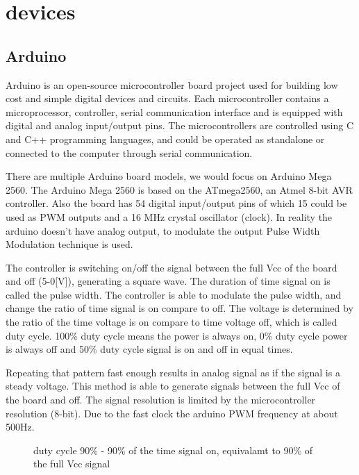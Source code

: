 \documentclass[\main/master.tex]{subfiles}
\begin{document}
\chapter{devices}\label{chp:3}
\doublespacing

\section{Arduino}
Arduino is an open-source microcontroller board project used for building low cost and simple digital devices and circuits. Each microcontroller contains a microprocessor, controller, serial communication interface and is equipped with digital and analog input/output pins. The microcontrollers are controlled using C and C++ programming languages, and could be operated as standalone or connected to the computer through serial communication. 
\par
There are multiple Arduino board models, we would focus on Arduino Mega 2560. The Arduino Mega 2560 is based on the ATmega2560, an Atmel 8-bit AVR controller. Also the board has 54 digital input/output pins of which 15 could be used as PWM outputs and a 16 MHz crystal oscillator (clock). In reality the arduino doesn't have analog output, to modulate the output Pulse Width Modulation technique is used.
\par
The controller is switching on/off the signal between the full Vcc of the board and off (5-0[V]), generating a square wave. The duration of time signal on is called the pulse width. The controller is able to modulate the pulse width, and change the ratio of time signal is on compare to off. The voltage is determined by the ratio of the time voltage is on compare to time voltage off, which is called duty cycle. 100\% duty cycle means the power is always on, 0\% duty cycle power is always off and 50\% duty cycle signal is on and off in equal times. 
\par
Repeating that pattern fast enough results in analog signal as if the signal is a steady voltage. This method is able to generate signals between the full Vcc of the board and off. The signal resolution is limited by the microcontroller resolution (8-bit). Due to the fast clock the arduino PWM frequency at about 500Hz.
\par
\begin{figure}[htbp]
	\centering
	\caption[duty cycle 90\%]{duty cycle 90\%  - 90\% of the time signal on, equivalamt to 90\% of the full Vcc signal}
	\label{fig:sine-wave1}
\end{figure}
\end{document}
